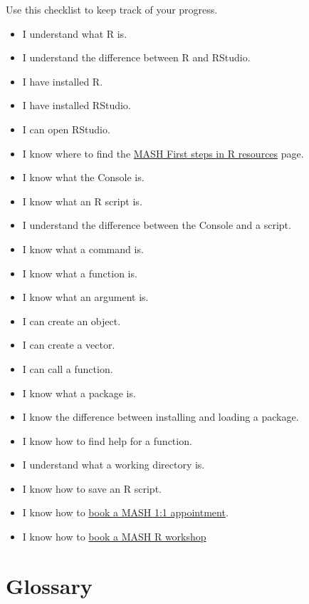 \documentclass[
]{book}
\providecommand{\tightlist}{%
  \setlength{\itemsep}{0pt}\setlength{\parskip}{0pt}}
\begin{document}
Use this checklist to keep track of your progress.

\begin{itemize}
\tightlist
\item[$\square$]
  I understand what R is.
\item[$\square$]
  I understand the difference between R and RStudio.
\item[$\square$]
  I have installed R.
\item[$\square$]
  I have installed RStudio.
\item[$\square$]
  I can open RStudio.
\item[$\square$]
  I know where to find the \href{https://sheffield.ac.uk/mash/stats-resources/r\#First-steps}{MASH First steps in R resources} page.
\item[$\square$]
  I know what the Console is.
\item[$\square$]
  I know what an R script is.
\item[$\square$]
  I understand the difference between the Console and a script.
\item[$\square$]
  I know what a command is.
\item[$\square$]
  I know what a function is.
\item[$\square$]
  I know what an argument is.
\item[$\square$]
  I can create an object.
\item[$\square$]
  I can create a vector.
\item[$\square$]
  I can call a function.
\item[$\square$]
  I know what a package is.
\item[$\square$]
  I know the difference between installing and loading a package.
\item[$\square$]
  I know how to find help for a function.
\item[$\square$]
  I understand what a working directory is.
\item[$\square$]
  I know how to save an R script.
\item[$\square$]
  I know how to \href{https://students.sheffield.ac.uk/mash/bookings/stats-support\#book-here}{book a MASH 1:1 appointment}.
\item[$\square$]
  I know how to \href{https://students.sheffield.ac.uk/mash/workshops\#bookig-calendar}{book a MASH R workshop}
\end{itemize}

\section{Glossary}\label{glossary}
\end{document}
